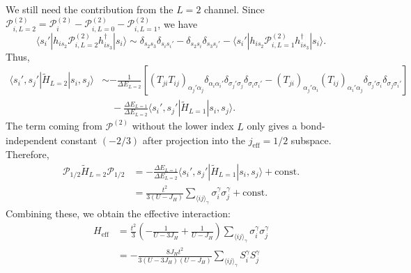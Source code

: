 \documentclass[11pt, a4paper]{article}
\begin{document}
We still need the contribution from the $L=2$ channel. Since $\mathcal{P}_{i, L=2}^{(2)} = \mathcal{P}_i^{(2)} - \mathcal{P}_{i, L=0}^{(2)} - \mathcal{P}_{i, L=1}^{(2)}$, we have
\begin{equation}
\langle s_i' | h_{is_2} \mathcal{P}_{i, L=2}^{(2)} h_{is_3}^{\dagger} | s_i \rangle \sim \delta_{s_2 s_3} \delta_{s_i s_i'} - \delta_{s_2 s_i} \delta_{s_3 s_i'} - \langle s_i' | h_{is_2} \mathcal{P}_{i, L=1}^{(2)} h_{is_3}^{\dagger} | s_i \rangle.
\end{equation}
Thus,
\begin{align}
\langle s_i', s_j' | \tilde{H}_{L=2} | s_i, s_j \rangle &\sim -\frac{1}{\Delta E_{L=2}} [(T_{ji} T_{ij})_{\alpha_j' \alpha_j} \delta_{\alpha_i \alpha_i'} \delta_{\sigma_j' \sigma_j} \delta_{\sigma_i \sigma_i'} - (T_{ji})_{\alpha_j' \alpha_i} (T_{ij})_{\alpha_i' \alpha_j} \delta_{\sigma_j' \sigma_i} \delta_{\sigma_j \sigma_i'}] \nonumber \\
&\quad - \frac{\Delta E_{L=1}}{\Delta E_{L=2}} \langle s_i', s_j' | \tilde{H}_{L=1} | s_i, s_j \rangle.
\end{align}
The term coming from $\mathcal{P}^{(2)}$ without the lower index $L$ only gives a bond-independent constant $(-2/3)$ after projection into the $j_{\text{eff}}=1/2$ subspace. Therefore,
\begin{align}
\mathcal{P}_{1/2} \tilde{H}_{L=2} \mathcal{P}_{1/2} &= -\frac{\Delta E_{L=1}}{\Delta E_{L=2}} \langle s_i', s_j' | \tilde{H}_{L=1} | s_i, s_j \rangle + \text{const.} \nonumber \\
&= \frac{t^2}{3(U-J_H)} \sum_{\langle ij \rangle_{\gamma}} \sigma_i^{\gamma} \sigma_j^{\gamma} + \text{const.}
\end{align}
Combining these, we obtain the effective interaction:
\begin{align}
H_{\text{eff}} &= \frac{t^2}{3} \left( -\frac{1}{U-3J_H} + \frac{1}{U-J_H} \right) \sum_{\langle ij \rangle_{\gamma}} \sigma_i^{\gamma} \sigma_j^{\gamma} \nonumber \\
&= -\frac{8J_H t^2}{3(U-3J_H)(U-J_H)} \sum_{\langle ij \rangle_{\gamma}} S_i^{\gamma} S_j^{\gamma}
\end{align}
\end{document}
